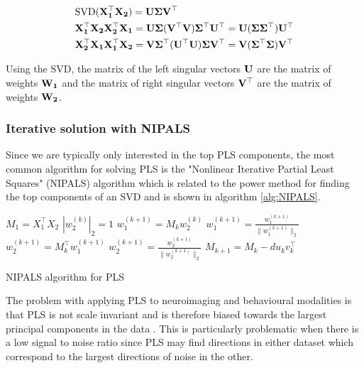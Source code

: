 \begin{align}
     & \text{SVD}(\bold{X_1^{\top}X_2})=\bold{U\Sigma V^{\top}}                                                              \\
     & \bold{X_1^{\top}X_2X_2^{\top}X_1}=\bold{U\Sigma (V^{\top} V) \Sigma^{\top} U^{\top}=U(\Sigma \Sigma^{\top}) U^{\top}} \\
     & \bold{X_2^{\top}X_1X_1^{\top}X_2}=\bold{V\Sigma^{\top} (U^{\top} U) \Sigma V^{\top}=V(\Sigma^{\top} \Sigma) V^{\top}}
\end{align}

Using the SVD, the matrix of the left singular vectors $\bold{U}$ are the matrix of weights $\bold{W_1}$ and the matrix of right singular vectors $\bold{V^{\top}}$ are the matrix of weights $\bold{W_2}$.

\subsubsection{Iterative solution with NIPALS}

Since we are typically only interested in the top PLS components, the most common algorithm for solving PLS is the "Nonlinear Iterative Partial Least Squares" (NIPALS) algorithm \cite{wold1966estimation}
which is related to the power method for finding the top components of an SVD and is shown in algorithm \ref{alg:NIPALS}.

\vspace{\baselineskip}
\begin{algorithm}
    \begin{algorithmic}
        \STATE $M_1=X_1^{\top}X_2$
         $|w^{(k)}_2|_2=1$
        \STATE $w^{(k+1)}_1=M_kw^{(k)}_2$
        \STATE $w^{(k+1)}_1=\frac{w^{(k+1)}_1}{\|w^{(k+1)}_1\|_2}$
        \STATE $w^{(k+1)}_2=M_k^{\top}w^{(k+1)}_1$
        \STATE $w^{(k+1)}_2=\frac{w^{(k+1)}_2}{\|w^{(k+1)}_2\|_2}$
        \STATE$M_{k+1}=M_k-du_kv_k^{\top}$
        \ENDWHILE
        \ENDFOR
        \caption[NIPALS for PLS]{NIPALS algorithm for PLS}
        \label{alg:NIPALS}
    \end{algorithmic}
\end{algorithm}

The problem with applying PLS to neuroimaging and behavioural modalities is that PLS is not scale invariant and is therefore biased towards the largest principal components in the data \cite{helmer2020stability}. This is particularly problematic when there is a low signal to noise ratio since PLS may find directions in either dataset which correspond to the largest directions of noise in the other.

